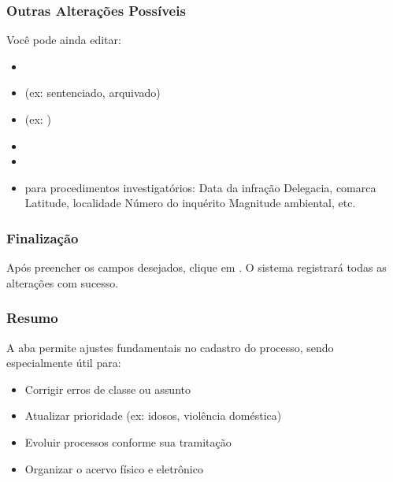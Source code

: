 \documentclass[letterpaper,10pt,brazil]{sphinxmanual}
\begin{document}
\subsubsection{Outras Alterações Possíveis}
\label{\detokenize{projud_19_evolucao_retificacao:outras-alteracoes-possiveis}}
\sphinxAtStartPar
Você pode ainda editar:
\begin{itemize}
\item {} 
\sphinxAtStartPar
{}

\item {} 
\sphinxAtStartPar
{} (ex: sentenciado, arquivado)

\item {} 
\sphinxAtStartPar
{} (ex: )

\item {} 
\sphinxAtStartPar
{}

\item {} 
\sphinxAtStartPar
{}

\item {} 
\sphinxAtStartPar
{} para procedimentos investigatórios:
\sphinxhyphen{} Data da infração
\sphinxhyphen{} Delegacia, comarca
\sphinxhyphen{} Latitude, localidade
\sphinxhyphen{} Número do inquérito
\sphinxhyphen{} Magnitude ambiental, etc.

\end{itemize}


\subsubsection{Finalização}
\label{\detokenize{projud_19_evolucao_retificacao:finalizacao}}
\sphinxAtStartPar
Após preencher os campos desejados, clique em . O sistema registrará todas as alterações com sucesso.


\subsubsection{Resumo}
\label{\detokenize{projud_19_evolucao_retificacao:resumo}}
\sphinxAtStartPar
A aba  permite ajustes fundamentais no cadastro do processo, sendo especialmente útil para:
\begin{itemize}
\item {} 
\sphinxAtStartPar
Corrigir erros de classe ou assunto

\item {} 
\sphinxAtStartPar
Atualizar prioridade (ex: idosos, violência doméstica)

\item {} 
\sphinxAtStartPar
Evoluir processos conforme sua tramitação

\item {} 
\sphinxAtStartPar
Organizar o acervo físico e eletrônico

\end{itemize}
\end{document}
